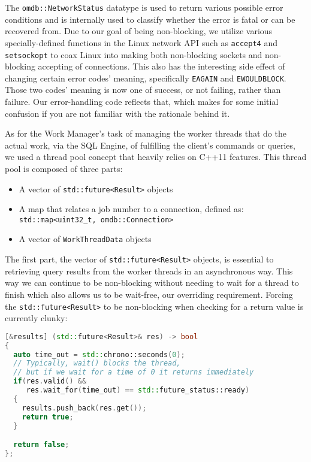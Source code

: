 \documentclass[letterpaper, 12pt]{article}
\begin{document}
  The \lstinline[basicstyle=\ttfamily]|omdb::NetworkStatus| datatype is used to return various 
  possible error conditions and is internally used to classify whether the error is fatal 
  or can be recovered from. Due to our goal of being non-blocking, we utilize various specially-defined
  functions in the Linux network API such as \lstinline[basicstyle=\ttfamily]|accept4| and 
  \lstinline[basicstyle=\ttfamily]|setsockopt| to coax Linux into making both non-blocking
  sockets and non-blocking accepting of connections. This also has the interesting side effect of
  changing certain error codes' meaning, specifically \lstinline[basicstyle=\ttfamily]|EAGAIN| and 
  \lstinline[basicstyle=\ttfamily]|EWOULDBLOCK|. Those two codes' meaning is now one of success, or not 
  failing, rather than failure. Our error-handling code reflects that, which makes for some initial 
  confusion if you are not familiar with the rationale behind it.
  \par\vspace{\baselineskip}
  As for the Work Manager's task of managing the worker threads that do the actual work, via the 
  SQL Engine, of fulfilling the client's commands or queries, we used a thread pool concept that
  heavily relies on C++11 features. This thread pool is composed of three parts:
  \begin{itemize}
   \item A vector of \lstinline[]|std::future<Result>| objects
   \item A map that relates a job number to a connection, defined as:\\
	 \lstinline[]|std::map<uint32_t, omdb::Connection>|
   \item A vector of \lstinline[]|WorkThreadData| objects
  \end{itemize}
  The first part, the vector of \lstinline|std::future<Result>| objects, is 
  essential to retrieving query results from the worker threads in an asynchronous way. This way
  we can continue to be non-blocking without needing to wait for a thread to finish which also
  allows us to be wait-free, our overriding requirement. Forcing the \lstinline|std::future<Result>|
  to be non-blocking when checking for a return value is currently clunky:
  \begin{lstlisting}[language=C++]
[&results] (std::future<Result>& res) -> bool
{
  auto time_out = std::chrono::seconds(0);
  // Typically, wait() blocks the thread, 
  // but if we wait for a time of 0 it returns immediately
  if(res.valid() &&
     res.wait_for(time_out) == std::future_status::ready)
  {
    results.push_back(res.get());
    return true;
  }

  return false;
};
  \end{lstlisting}
\end{document}
